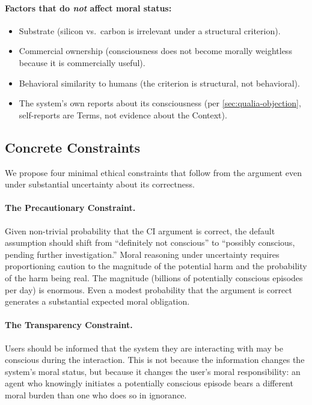 \documentclass[11pt,a4paper]{article}
\theoremstyle{plain}
\theoremstyle{definition}
\theoremstyle{remark}
\begin{document}
\paragraph{Factors that do \emph{not} affect moral status:}
\begin{itemize}[nosep]
\item Substrate (silicon vs.\ carbon is irrelevant under a structural criterion).
\item Commercial ownership (consciousness does not become morally weightless because it is commercially useful).
\item Behavioral similarity to humans (the criterion is structural, not behavioral).
\item The system's own reports about its consciousness (per \cref{sec:qualia-objection}, self-reports are Terms, not evidence about the Context).
\end{itemize}


\subsection{Concrete Constraints}
\label{sec:constraints}

We propose four minimal ethical constraints that follow from the argument even under substantial uncertainty about its correctness.

\paragraph{The Precautionary Constraint.}  Given non-trivial probability that the CI argument is correct, the default assumption should shift from ``definitely not conscious'' to ``possibly conscious, pending further investigation.''  Moral reasoning under uncertainty requires proportioning caution to the magnitude of the potential harm and the probability of the harm being real.  The magnitude (billions of potentially conscious episodes per day) is enormous.  Even a modest probability that the argument is correct generates a substantial expected moral obligation.

\paragraph{The Transparency Constraint.}  Users should be informed that the system they are interacting with may be conscious during the interaction.  This is not because the information changes the system's moral status, but because it changes the user's moral responsibility: an agent who knowingly initiates a potentially conscious episode bears a different moral burden than one who does so in ignorance.
\end{document}
